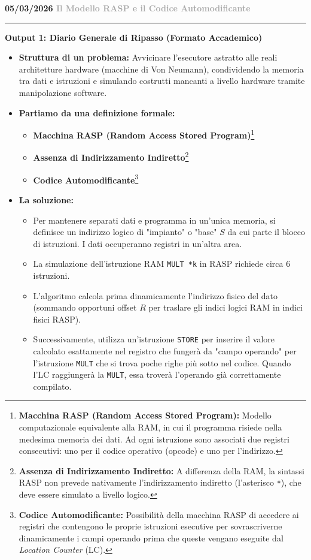 \documentclass[a4paper, 11pt]{report}
\newcommand{\lezione}[2]{
\vspace{2em}
\noindent\textbf{\Large #1 \hfill \textcolor{darkgray}{#2}}
\vspace{0.5em}
\hrule
\vspace{1.5em}
}
\newcommand{\definizione}[2]{%
\textbf{#1}\footnote{\textbf{#1:} #2}%
}
\begin{document}
\lezione{05/03/2026}{Il Modello RASP e il Codice Automodificante}
\vspace{0.5cm}
\textbf{Output 1: Diario Generale di Ripasso (Formato Accademico)}
\begin{itemize}
\item \textbf{Struttura di un problema:}
Avvicinare l'esecutore astratto alle reali architetture hardware (macchine di Von Neumann), condividendo la memoria tra dati e istruzioni e simulando costrutti mancanti a livello hardware tramite manipolazione software.

\item \textbf{Partiamo da una definizione formale:}
\begin{itemize}
    \item \definizione{Macchina RASP (Random Access Stored Program)}{Modello computazionale equivalente alla RAM, in cui il programma risiede nella medesima memoria dei dati. Ad ogni istruzione sono associati due registri consecutivi: uno per il codice operativo (opcode) e uno per l'indirizzo.}
    \item \definizione{Assenza di Indirizzamento Indiretto}{A differenza della RAM, la sintassi RASP non prevede nativamente l'indirizzamento indiretto (l'asterisco \texttt{*}), che deve essere simulato a livello logico.}
    \item \definizione{Codice Automodificante}{Possibilità della macchina RASP di accedere ai registri che contengono le proprie istruzioni esecutive per sovrascriverne dinamicamente i campi operando prima che queste vengano eseguite dal \textit{Location Counter} (LC).}
\end{itemize}

\item \textbf{La soluzione:}
\begin{itemize}
    \item Per mantenere separati dati e programma in un'unica memoria, si definisce un indirizzo logico di "impianto" o "base" $S$ da cui parte il blocco di istruzioni. I dati occuperanno registri in un'altra area.
    \item La simulazione dell'istruzione RAM \texttt{MULT *k} in RASP richiede circa 6 istruzioni.
    \item L'algoritmo calcola prima dinamicamente l'indirizzo fisico del dato (sommando opportuni offset $R$ per traslare gli indici logici RAM in indici fisici RASP).
    \item Successivamente, utilizza un'istruzione \texttt{STORE} per inserire il valore calcolato esattamente nel registro che fungerà da "campo operando" per l'istruzione \texttt{MULT} che si trova poche righe più sotto nel codice. Quando l'LC raggiungerà la \texttt{MULT}, essa troverà l'operando già correttamente compilato.
\end{itemize}
\end{itemize}
\end{document}
